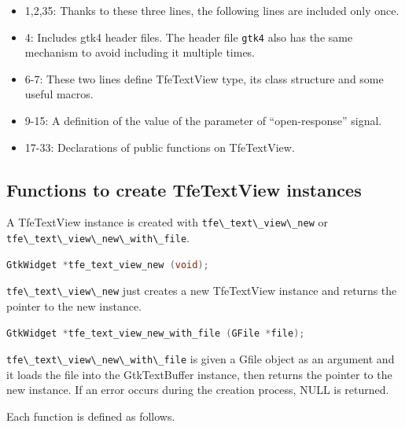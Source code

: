 \begin{itemize}
\tightlist
\item
  1,2,35: Thanks to these three lines, the following lines are included
  only once.
\item
  4: Includes gtk4 header files. The header file
  \passthrough{\lstinline!gtk4!} also has the same mechanism to avoid
  including it multiple times.
\item
  6-7: These two lines define TfeTextView type, its class structure and
  some useful macros.
\item
  9-15: A definition of the value of the parameter of ``open-response''
  signal.
\item
  17-33: Declarations of public functions on TfeTextView.
\end{itemize}

\hypertarget{functions-to-create-tfetextview-instances}{%
\subsection{Functions to create TfeTextView
instances}\label{functions-to-create-tfetextview-instances}}

A TfeTextView instance is created with
\passthrough{\lstinline!tfe\_text\_view\_new!} or
\passthrough{\lstinline!tfe\_text\_view\_new\_with\_file!}.

\begin{lstlisting}[language=C]
GtkWidget *tfe_text_view_new (void);
\end{lstlisting}

\passthrough{\lstinline!tfe\_text\_view\_new!} just creates a new
TfeTextView instance and returns the pointer to the new instance.

\begin{lstlisting}[language=C]
GtkWidget *tfe_text_view_new_with_file (GFile *file);
\end{lstlisting}

\passthrough{\lstinline!tfe\_text\_view\_new\_with\_file!} is given a
Gfile object as an argument and it loads the file into the GtkTextBuffer
instance, then returns the pointer to the new instance. If an error
occurs during the creation process, NULL is returned.

Each function is defined as follows.

